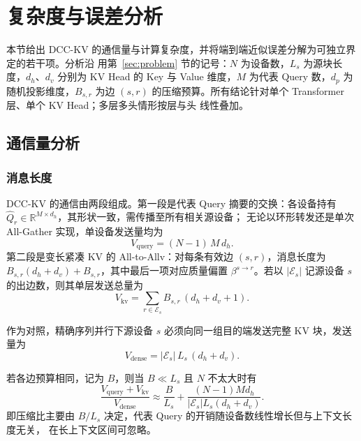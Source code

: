 \section{复杂度与误差分析}
\label{sec:analysis}

本节给出 DCC-KV 的通信量与计算复杂度，并将端到端近似误差分解为可独立界定的若干项。分析沿
用第~\ref{sec:problem} 节的记号：$N$ 为设备数，$L_s$ 为源块长度，$d_h$、$d_v$ 分别为
KV Head 的 Key 与 Value 维度，$M$ 为代表 Query 数，$d_p$ 为随机投影维度，$B_{s,r}$ 为边
$(s,r)$ 的压缩预算。所有结论针对单个 Transformer 层、单个 KV Head；多层多头情形按层与头
线性叠加。

\subsection{通信量分析}
\label{sec:analysis-comm}

\subsubsection{消息长度}

DCC-KV 的通信由两段组成。第一段是代表 Query 摘要的交换：各设备持有
$\widehat{Q}_r \in \mathbb{R}^{M \times d_h}$，其形状一致，需传播至所有相关源设备；
无论以环形转发还是单次 All-Gather 实现，单设备发送量均为
\begin{equation}
\label{eq:comm-query}
V_{\text{query}} = (N-1) \, M \, d_h .
\end{equation}
第二段是变长紧凑 KV 的 All-to-Allv：对每条有效边 $(s,r)$，消息长度为
$B_{s,r}(d_h + d_v) + B_{s,r}$，其中最后一项对应质量偏置 $\beta^{s \to r}$。若以
$|\mathcal{E}_s|$ 记源设备 $s$ 的出边数，则其单层发送总量为
\begin{equation}
\label{eq:comm-kv}
V_{\text{kv}} = \sum_{r \in \mathcal{E}_s}
B_{s,r}\,(d_h + d_v + 1).
\end{equation}

作为对照，精确序列并行下源设备 $s$ 必须向同一组目的端发送完整 KV 块，发送量为
\begin{equation}
\label{eq:comm-dense}
V_{\text{dense}} = |\mathcal{E}_s| \, L_s \, (d_h + d_v) .
\end{equation}

若各边预算相同，记为 $B$，则当 $B \ll L_s$ 且 $N$ 不太大时有
\begin{equation}
\label{eq:comm-ratio}
\frac{V_{\text{query}} + V_{\text{kv}}}{V_{\text{dense}}}
\approx \frac{B}{L_s} + \frac{(N-1) M d_h}{|\mathcal{E}_s| L_s (d_h+d_v)} .
\end{equation}
即压缩比主要由 $B/L_s$ 决定，代表 Query 的开销随设备数线性增长但与上下文长度无关，
在长上下文区间可忽略。

